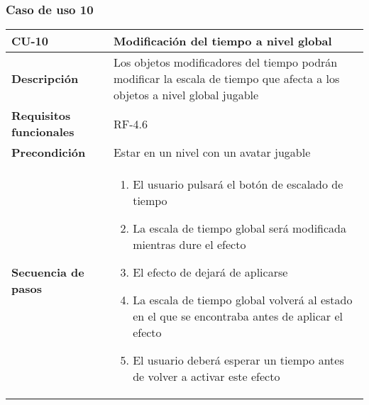 \subsubsection{Caso de uso 10}
\begin{tabularx}{\columnwidth}{l|l}
\begin{minipage}{0.25\columnwidth}
\textbf{CU-10} 
\end{minipage}
&
\begin{minipage}{0.65\columnwidth}
Modificación del tiempo a nivel global
\end{minipage}
\\ \hline

\begin{minipage}{0.25\columnwidth}
\textbf{Descripción} 
\end{minipage}
&
\begin{minipage}{0.65\columnwidth}
Los objetos modificadores del tiempo podrán modificar la escala de tiempo que afecta a los objetos a nivel global jugable
\end{minipage}
\\ \hline

\begin{minipage}{0.25\columnwidth}
\textbf{Requisitos funcionales} 
\end{minipage}
&
\begin{minipage}{0.65\columnwidth}
RF-4.6
\end{minipage}
\\ \hline

\begin{minipage}{0.25\columnwidth}
\textbf{Precondición} 
\end{minipage}
&
\begin{minipage}{0.65\columnwidth}
Estar en un nivel con un avatar jugable
\end{minipage}
\\ \hline

\begin{minipage}{0.25\columnwidth}
\textbf{Secuencia de pasos} 
\end{minipage}
&
\begin{minipage}{0.65\columnwidth}
\begin{enumerate}
\item
El usuario pulsará el botón de escalado de tiempo
\item
La escala de tiempo global será modificada mientras dure el efecto
\item
El efecto de dejará de aplicarse
\item
La escala de tiempo global volverá al estado en el que se encontraba antes de aplicar el efecto
\item
El usuario deberá esperar un tiempo antes de volver a activar este efecto
\end{enumerate}
\end{minipage}
\\ \hline


\end{tabularx}
